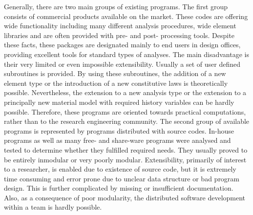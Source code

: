 \begin{htmlonly}
\begin{center}
Generally, there are two main groups of  existing programs. 
The first group consists of commercial products available on the market. These codes
are offering wide functionality including many different analysis procedures,
wide element libraries and are often provided with pre- and post-
processing tools. Despite these facts, these packages are designated
mainly to end users in design offices, providing excellent
tools for standard types of analyses. The main disadvantage is their
very limited or even impossible extensibility. Usually a set of user
defined subroutines is provided. By using these subroutines, the addition
of a new element type or the introduction of a new constitutive
laws is theoretically possible. Nevertheless, the extension to a new analysis
type or the extension to a principally new material model with required
history variables can be hardly possible. Therefore, these programs
are oriented towards practical computations, rather than to the
research engineering community.  
The second group of available programs is represented by programs
distributed with source codes. In-house programs as well as many free-
and share-ware programs were analysed and tested to determine whether they fulfilled
required needs. 
They usually proved to be entirely inmodular or very poorly
modular. Extensibility, primarily of interest to a researcher, is enabled
due to existence of source code, but it is extremely time consuming
and error prone due to unclear data structure or bad program
design. This is further complicated by missing or insufficient
documentation. 
Also, as a consequence of poor modularity, the distributed software
development within a team is hardly possible.



\end{center}
\end{htmlonly}
